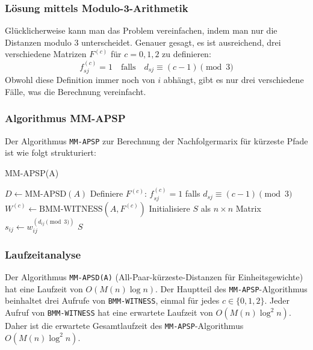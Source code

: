 \documentclass{scrartcl}
\numberwithin{equation}{section}
\begin{document}
\subsubsection{Lösung mittels Modulo-3-Arithmetik}
Glücklicherweise kann man das Problem vereinfachen, indem man nur die Distanzen modulo 3 unterscheidet. Genauer gesagt, es ist ausreichend, drei verschiedene Matrizen $F^{(c)}$ für $c=0, 1, 2$ zu definieren:
$$f_{sj}^{(c)}=1 \quad \text{falls} \quad d_{sj} \equiv (c-1) \pmod 3$$
Obwohl diese Definition immer noch von $i$ abhängt, gibt es nur drei verschiedene Fälle, was die Berechnung vereinfacht.

\subsubsection{Algorithmus MM-APSP}
Der Algorithmus \texttt{MM-APSP} zur Berechnung der Nachfolgermarix für kürzeste Pfade ist wie folgt strukturiert:

\begin{algorithm}
	\caption{MM-APSP(A)}
	\begin{algorithmic}[1]
		\State $D \gets \text{MM-APSD}(A)$ 
		\State Definiere $F^{(c)}$: $f_{sj}^{(c)}=1$ falls $d_{sj} \equiv (c-1) \pmod 3$
		\State $W^{(c)} \gets \text{BMM-WITNESS}(A, F^{(c)})$ 
		\EndFor
		\State Initialisiere $S$ als $n \times n$ Matrix
		\State $s_{ij} \gets w_{ij}^{(d_{ij} \pmod 3)}$ 
		\EndFor
		\Return $S$
	\end{algorithmic}
\end{algorithm}

\subsubsection{Laufzeitanalyse}
Der Algorithmus \texttt{MM-APSD(A)} (All-Paar-kürzeste-Distanzen für Einheitsgewichte) hat eine Laufzeit von $O(M(n) \log n)$. Der Hauptteil des \texttt{MM-APSP}-Algorithmus beinhaltet drei Aufrufe von \texttt{BMM-WITNESS}, einmal für jedes $c \in \{0, 1, 2\}$. Jeder Aufruf von \texttt{BMM-WITNESS} hat eine erwartete Laufzeit von $O(M(n) \log^2 n)$. Daher ist die erwartete Gesamtlaufzeit des \texttt{MM-APSP}-Algorithmus $O(M(n) \log^2 n)$.
\end{document}
